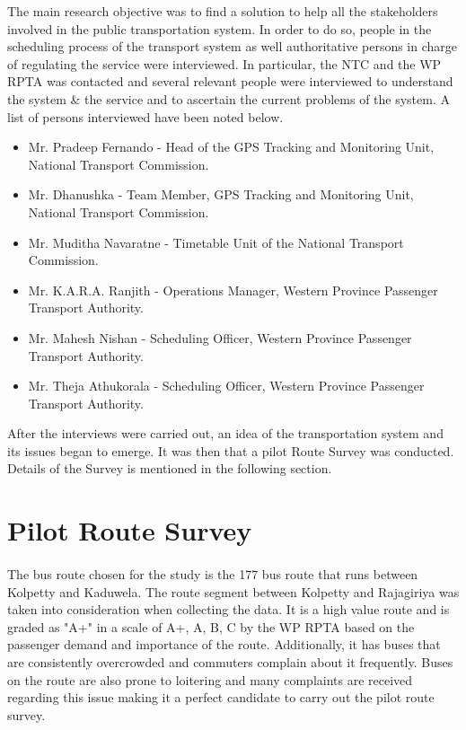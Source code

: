 \documentclass[12pt, oneside]{report}
\begin{document}
The main research objective was to find a solution to help all the stakeholders involved in the public transportation system. In order to do so, people in the scheduling process of the transport system as well authoritative persons in charge of regulating the service were interviewed. In particular, the NTC and the WP RPTA was contacted and several relevant people were interviewed to understand the system \& the service and to ascertain the current problems of the system. A list of persons interviewed have been noted below.

\begin{itemize}
\item Mr. Pradeep Fernando - Head of the GPS Tracking and Monitoring Unit, National Transport Commission.
\item Mr. Dhanushka - Team Member, GPS Tracking and Monitoring Unit, National Transport Commission.
\item Mr. Muditha Navaratne - Timetable Unit of the National Transport Commission.
\item Mr. K.A.R.A. Ranjith - Operations Manager, Western Province Passenger Transport Authority.
\item Mr. Mahesh Nishan - Scheduling Officer, Western Province Passenger Transport Authority.
\item Mr. Theja Athukorala - Scheduling Officer, Western Province Passenger Transport Authority.
\end{itemize}

After the interviews were carried out, an idea of the transportation system and its issues began to emerge. It was then that a pilot Route Survey was conducted. Details of the Survey is mentioned in the following section.

\section{Pilot Route Survey}

\paragraph{ } The bus route chosen for the study is the 177 bus route that runs between Kolpetty and Kaduwela. The route segment between Kolpetty and Rajagiriya was taken into consideration when collecting the data. It is a high value route and is graded as "A+" in a scale of A+, A, B, C by the WP RPTA based on the passenger demand and importance of the route. Additionally, it has buses that are consistently overcrowded and commuters complain about it frequently. Buses on the route are also prone to loitering and many complaints are received regarding this issue making it a perfect candidate to carry out the pilot route survey.
\end{document}
